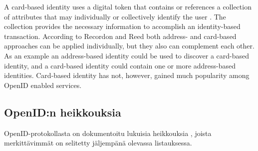 \documentclass[english,gradu]{tktltiki}
\begin{document}
A card-based identity uses a digital token that contains or references a collection of attributes that may individually or collectively identify the user \cite{openid_2.0_platform_2009}. The collection provides the necessary information to accomplish an identity-based transaction. According to Recordon and Reed \cite{openid_2.0_platform_2009} both address- and card-based approaches can be applied individually, but they also can complement each other. As an example an address-based identity could be used to discover a card-based identity, and a card-based identity could contain one or more address-based identities. Card-based identity has not, however, gained much popularity among OpenID enabled services.



\subsection{OpenID:n heikkouksia} %
\label{sub:openid_n_heikkouksia}

OpenID-protokollasta on dokumentoitu lukuisia heikkouksia \cite{blackhat_openid_security_story, cameron_infocard_07, three_types_of_openid_ids_10}, joista merkittävimmät on selitetty jäljempänä olevassa listauksessa.
\end{document}

